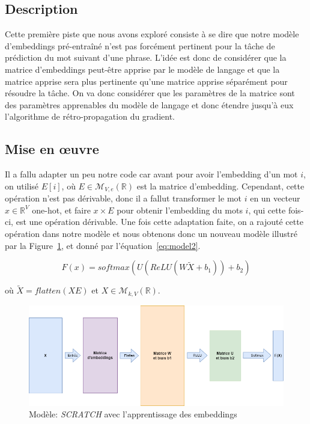 \documentclass[a4paper]{article}
\begin{document}
\subsection{Description}

Cette première piste que nous avons exploré consiste à se dire que notre modèle d'embeddings pré-entraîné n'est pas forcément 
pertinent pour la tâche de prédiction du mot suivant d'une phrase. L'idée est donc de considérer que la matrice d'embeddings 
peut-être apprise par le modèle de langage et que la matrice apprise sera plus pertinente qu'une matrice apprise séparément pour 
résoudre la tâche. On va donc considérer que les paramètres de la matrice sont des paramètres apprenables du modèle de langage et 
donc étendre jusqu'à eux l'algorithme de rétro-propagation du gradient.

\subsection{Mise en \oe uvre}

Il a fallu adapter un peu notre code car avant pour avoir l'embedding d'un mot $i$, on utilisé $E[i]$, où 
$E \in \mathcal{M}_{V, e}(\mathbb{R})$ est la matrice d'embedding. Cependant, cette opération n'est pas dérivable, donc il a 
fallut transformer le mot $i$ en un vecteur $x \in \mathbb{R}^V$ one-hot, et faire $x \times E$ pour obtenir l'embedding du 
mots $i$, qui cette fois-ci, est une opération dérivable. 
Une fois cette adaptation faite, on a rajouté cette opération dans notre modèle et nous obtenons donc un nouveau modèle illustré 
par la Figure~\ref{fig:model2}, et donné par l'équation~\ref{eq:model2}.


\begin{equation}
  F(x)=softmax(U(ReLU(W\tilde{X}+b_1))+b_2)
  \label{eq:model2}
\end{equation}

où $\tilde{X}=flatten(XE)$ et $X \in \mathcal{M}_{k, V}(\mathbb{R})$.



\begin{figure}
    \centering
    \includegraphics[width=0.60\linewidth]{model2.png}
    \caption{Modèle: \textit{SCRATCH} avec l'apprentissage des embeddings}
    \label{fig:model2}
\end{figure}
\end{document}
